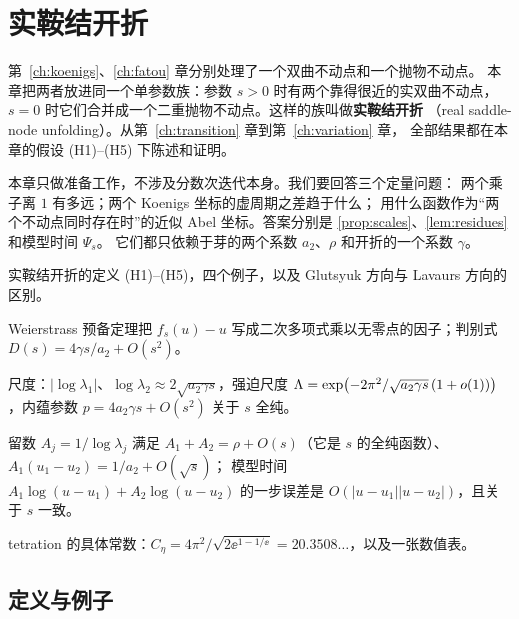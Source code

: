 
\chapter{实鞍结开折}\label{ch:unfolding}

第~\ref{ch:koenigs}、\ref{ch:fatou} 章分别处理了一个双曲不动点和一个抛物不动点。
本章把两者放进同一个单参数族：参数 $s>0$ 时有两个靠得很近的实双曲不动点，
$s=0$ 时它们合并成一个二重抛物不动点。这样的族叫做\textbf{实鞍结开折}
（real saddle-node unfolding）。从第~\ref{ch:transition} 章到第~\ref{ch:variation} 章，
全部结果都在本章的假设 (H1)--(H5) 下陈述和证明。

本章只做准备工作，不涉及分数次迭代本身。我们要回答三个定量问题：
两个乘子离 $1$ 有多远；两个 Koenigs 坐标的虚周期之差趋于什么；
用什么函数作为``两个不动点同时存在时''的近似 Abel 坐标。答案分别是
\cref{prop:scales}、\cref{lem:residues} 和模型时间 $\Psi_s$。
它们都只依赖于芽的两个系数 $a_2$、$\rho$ 和开折的一个系数 $\gamma$。

\begin{goals}
\item 实鞍结开折的定义 (H1)--(H5)，四个例子，以及 Glutsyuk 方向与 Lavaurs 方向的区别。
\item Weierstrass 预备定理把 $f_s(u)-u$ 写成二次多项式乘以无零点的因子；判别式 $D(s)=4\gamma s/a_2+O(s^2)$。
\item 尺度：$|\log\lambda_1|$、$\log\lambda_2\approx2\sqrt{a_2\gamma s}$，强迫尺度
  $\Lambda=\exp\bigl(-2\pi^2/\sqrt{a_2\gamma s}\,(1+o(1))\bigr)$，内蕴参数 $p=4a_2\gamma s+O(s^2)$ 关于 $s$ 全纯。
\item 留数 $A_j=1/\log\lambda_j$ 满足 $A_1+A_2=\rho+O(s)$（它是 $s$ 的全纯函数）、$A_1(u_1-u_2)=1/a_2+O(\sqrt s)$；
  模型时间 $A_1\log(u-u_1)+A_2\log(u-u_2)$ 的一步误差是 $O(|u-u_1||u-u_2|)$，且关于 $s$ 一致。
\item tetration 的具体常数：$C_\eta=4\pi^2/\sqrt{2\ee^{1-1/\ee}}=20.3508\ldots$，以及一张数值表。
\end{goals}

\section{定义与例子}\label{ch4:sec:def}

